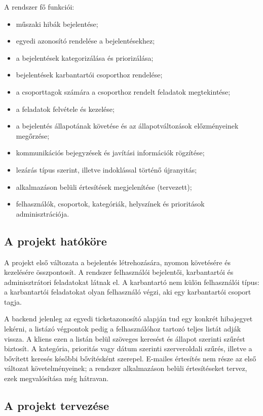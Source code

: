 \documentclass[12pt, a4paper, twoside]{article}
\begin{document}
A rendszer fő funkciói:

\begin{itemize}
    \item műszaki hibák bejelentése;
    \item egyedi azonosító rendelése a bejelentésekhez;
    \item a bejelentések kategorizálása és priorizálása;
    \item bejelentések karbantartói csoporthoz rendelése;
    \item a csoporttagok számára a csoporthoz rendelt feladatok megtekintése;
    \item a feladatok felvétele és kezelése;
    \item a bejelentés állapotának követése és az állapotváltozások előzményeinek megőrzése;
    \item kommunikációs bejegyzések és javítási információk rögzítése;
    \item lezárás típus szerint, illetve indoklással történő újranyitás;
    \item alkalmazáson belüli értesítések megjelenítése (tervezett);
    \item felhasználók, csoportok, kategóriák, helyszínek és prioritások adminisztrációja.
\end{itemize}

\subsection{A projekt hatóköre}

A projekt első változata a bejelentés létrehozására, nyomon követésére és kezelésére összpontosít. A rendszer felhasználói bejelentői, karbantartói és adminisztrátori feladatokat látnak el. A karbantartó nem külön felhasználói típus: a karbantartói feladatokat olyan felhasználó végzi, aki egy karbantartói csoport tagja.

A backend jelenleg az egyedi ticketazonosító alapján tud egy konkrét hibajegyet lekérni, a listázó végpontok pedig a felhasználóhoz tartozó teljes listát adják vissza. A kliens ezen a listán belül szöveges keresést és állapot szerinti szűrést biztosít. A kategória, prioritás vagy dátum szerinti szerveroldali szűrés, illetve a bővített keresés későbbi bővítésként szerepel. E-mailes értesítés nem része az első változat követelményeinek; a rendszer alkalmazáson belüli értesítéseket tervez, ezek megvalósítása még hátravan.

\subsection{A projekt tervezése}
\end{document}
